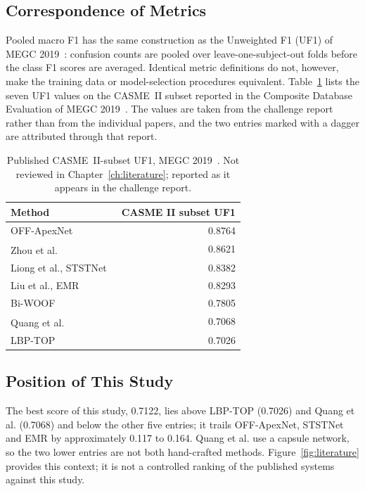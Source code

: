 \subsection{Correspondence of Metrics}
\label{sec:what-compared}
\label{sec:published-results}

Pooled macro F1 has the same construction as the Unweighted F1 (UF1) of MEGC 2019~\cite{see2019}: confusion counts are pooled over leave-one-subject-out folds before the class F1 scores are averaged. Identical metric definitions do not, however, make the training data or model-selection procedures equivalent. Table~\ref{tab:published-uf1} lists the seven UF1 values on the CASME~II subset reported in the Composite Database Evaluation of MEGC 2019~\cite{see2019}. The values are taken from the challenge report rather than from the individual papers, and the two entries marked with a dagger are attributed through that report.

\begin{table}[htbp]
	\centering
	\begin{tabular}{l r}
		\hline
		\textbf{Method} & \textbf{CASME II subset UF1} \\
		\hline
		OFF-ApexNet~\cite{liong2019a}              & 0.8764 \\
		Zhou et al.\textsuperscript{\textdagger}   & 0.8621 \\
		Liong et al., STSTNet~\cite{liong2019b}    & 0.8382 \\
		Liu et al., EMR~\cite{liu2019}             & 0.8293 \\
		Bi-WOOF~\cite{liong2018}                   & 0.7805 \\
		Quang et al.\textsuperscript{\textdagger}  & 0.7068 \\
		LBP-TOP~\cite{zhaoG2007}                   & 0.7026 \\
		\hline
	\end{tabular}
	\caption[Published CASME II-subset UF1, MEGC 2019]{Published CASME~II-subset UF1, MEGC 2019~\cite{see2019}. \textdagger{} Not reviewed in Chapter~\ref{ch:literature}; reported as it appears in the challenge report.}
	\label{tab:published-uf1}
\end{table}

\subsection{Position of This Study}
\label{sec:where-lands}

The best score of this study, 0.7122, lies above LBP-TOP (0.7026) and Quang et al. (0.7068) and below the other five entries; it trails OFF-ApexNet, STSTNet and EMR by approximately 0.117 to 0.164. Quang et al. use a capsule network, so the two lower entries are not both hand-crafted methods. Figure~\ref{fig:literature} provides this context; it is not a controlled ranking of the published systems against this study.

